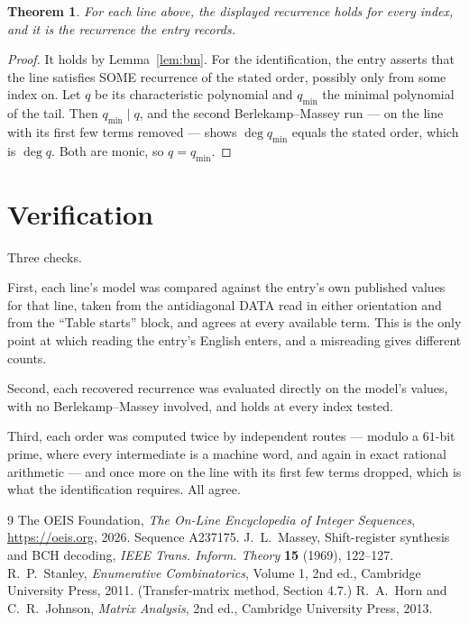 \documentclass[11pt,a4paper]{article}
\theoremstyle{plain}
\newtheorem{theorem}{Theorem}
\theoremstyle{definition}
\begin{document}
\begin{theorem}
For each line above, the displayed recurrence holds for every index, and it is the recurrence
the entry records.
\end{theorem}

\begin{proof}
It holds by Lemma~\ref{lem:bm}. For the identification, the entry asserts that the line
satisfies SOME recurrence of the stated order, possibly only from some index on. Let $q$ be its
characteristic polynomial and $q_{\min}$ the minimal polynomial of the tail. Then
$q_{\min}\mid q$, and the second Berlekamp--Massey run --- on the line with its first few
terms removed --- shows $\deg q_{\min}$ equals the stated order, which is $\deg q$. Both are
monic, so $q=q_{\min}$.
\end{proof}

\section{Verification}

Three checks.

First, each line's model was compared against the entry's own published values for that line,
taken from the antidiagonal DATA read in either orientation and from the ``Table starts''
block, and agrees at every available term. This is the only point at which reading the entry's
English enters, and a misreading gives different counts.

Second, each recovered recurrence was evaluated directly on the model's values, with no
Berlekamp--Massey involved, and holds at every index tested.

Third, each order was computed twice by independent routes --- modulo a $61$-bit prime, where
every intermediate is a machine word, and again in exact rational arithmetic --- and once more
on the line with its first few terms dropped, which is what the identification requires. All
agree.

\begin{thebibliography}{9}
 The OEIS Foundation, \emph{The On-Line Encyclopedia of Integer
Sequences}, \url{https://oeis.org}, 2026. Sequence A237175.
 J.~L.~Massey, Shift-register synthesis and BCH decoding, \emph{IEEE
Trans. Inform. Theory} \textbf{15} (1969), 122--127.
 R.~P.~Stanley, \emph{Enumerative Combinatorics}, Volume 1, 2nd ed.,
Cambridge University Press, 2011. (Transfer-matrix method, Section 4.7.)
 R.~A.~Horn and C.~R.~Johnson, \emph{Matrix Analysis}, 2nd ed., Cambridge
University Press, 2013.
\end{thebibliography}
\end{document}
